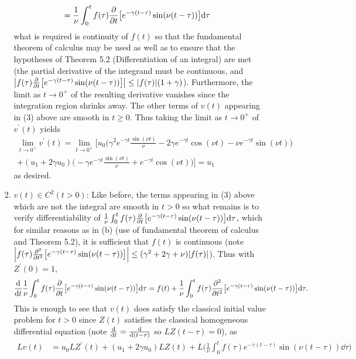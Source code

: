 \documentclass[11pt]{article}
\begin{document}
\begin{enumerate}
\begin{enumerate}[label=(\roman*)]
\begin{enumerate}[label=(\alph*)]
\begin{align*}
                &= \frac{1}{\nu}\int_0^t f(\tau)\pdv t \big[e^{-\gamma (t-\tau)}\sin(\nu(t- \tau))\big]\dd \tau
            \end{align*} what is required is continuity of $f(t)$ so that the fundamental theorem of calculus may be used as well as to ensure that the hypotheses of Theorem 5.2 (Differentiation of an integral) are met (the partial derivative of the integrand must be continuous, and $\abs{f(\tau)\pdv t \big[e^{-\gamma (t-\tau)}\sin(\nu(t- \tau))\big]}\leq \abs{f(\tau)}(1+\gamma)$). Furthermore, the limit as $t\to 0^+$ of the resulting derivative vanishes since the integration region shrinks away. The other terms of $v(t)$ appearing in (3) above are smooth in $t\geq 0$. Thus taking the limit as $t\to 0^+$ of $v^\prime(t)$ yields 
            \begin{multline*}
                \lim_{t\to 0^+}v^\prime(t) = \lim_{t\to 0^+} \bigg[ u_0\bigg(\gamma^2 e^{-\gamma t}\frac{\sin(\nu t)}{\nu} - 2\gamma e^{-\gamma t}\cos(\nu t) - \nu e^{-\gamma t}\sin(\nu t)\bigg) \\+ (u_1 + 2\gamma u_0)\bigg(-\gamma e^{-\gamma t}\frac{\sin(\nu t)}{\nu} + e^{-\gamma t}\cos(\nu t)\bigg)\bigg] = u_1
            \end{multline*} as desired.
            \item $v(t) \in C^2(t>0)$: Like before, the terms appearing in (3) above which are not the integral are smooth in $t> 0$ so what remains is to verify differentiability of $\frac{1}{\nu}\int_0^t f(\tau)\pdv t \big[e^{-\gamma (t-\tau)}\sin(\nu(t- \tau))\big]\dd \tau$, which for similar reasons as in (b) (use of fundamental theorem of calculus and Theorem 5.2), it is sufficient that $f(t)$ is continuous (note $\abs{f(\tau)\pdv[2]t \big[e^{-\gamma (t-\tau)}\sin(\nu(t- \tau))\big]}\leq (\gamma^2+2\gamma+ \nu)\abs{f(\tau)}$). Thus with $Z^\prime(0) = 1$,
            \[\dv t\frac{1}{\nu}\int_0^t f(\tau)\pdv t \big[e^{-\gamma (t-\tau)}\sin(\nu(t- \tau))\big]\dd \tau = f(t) + \frac{1}{\nu}\int_0^t f(\tau)\pdv[2] t \big[e^{-\gamma (t-\tau)}\sin(\nu(t- \tau))\big]\dd \tau.\]
            This is enough to see that $v(t)$ does satisfy the classical initial value problem for $t>0$ since $Z(t)$ satisfies the classical homogeneous differential equation (note $\dv t = \dv{(t-\tau)}$ so $LZ(t-\tau) = 0$), as 
            \begin{align*}
                Lv(t) &= u_0LZ^\prime(t) + (u_1+2\gamma u_0)LZ(t) + L\Big(\frac{1}{\nu}\int_0^t f(\tau)e^{-\gamma (t-\tau)}\sin(\nu(t- \tau))\dd \tau\Big)\\

\end{align*}
\end{enumerate}
\end{enumerate}
\end{enumerate}
\end{document}
